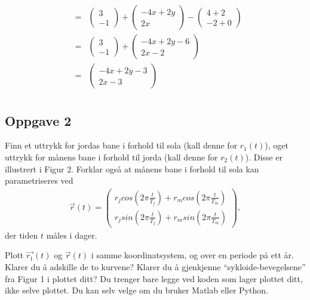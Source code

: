 \documentclass{../../myassignment}
\begin{document}
\begin{answer}
\begin{eqnarray*}
										&=& \begin{pmatrix} 3 \\ -1 \end{pmatrix} + \begin{pmatrix} -4x+2y \\ 2x \end{pmatrix} - \begin{pmatrix} 4+2 \\ -2+0 \end{pmatrix}\\
										&=& \begin{pmatrix} 3 \\ -1 \end{pmatrix} + \begin{pmatrix} -4x+2y-6\\ 2x-2 \end{pmatrix}\\
										&=& \begin{pmatrix} -4x+2y-3\\ 2x-3 \end{pmatrix}\\
			\end{eqnarray*}
		\end{answer}

	\subsection*{Oppgave 2}

	\begin{problem}
		Finn et uttrykk for jordas bane i forhold til sola (kall denne for $r_1(t)$), oget uttrykk for månens bane i forhold til jorda (kall denne for $r_2(t)$). Disse er illustrert i Figur 2. Forklar også at månens bane i forhold til sola kan parametriseres ved 
			\begin{eqnarray*}
				\vec{r}(t) = \begin{pmatrix}
					r_j cos(2\pi \frac{t}{T_j}) + r_m cos(2\pi \frac{t}{T_m}) \\
					r_j sin(2\pi \frac{t}{T_j}) +r_m sin(2\pi\frac{t}{T_m})
				\end{pmatrix},
			\end{eqnarray*}
				der tiden $t$ måles i dager.
	\end{problem}


	\begin{problem}
		Plott $\vec{r_1}(t)$ og $\vec{r}(t)$ i samme koordinatsystem, og over en periode på ett år. Klarer du å adskille de to kurvene? Klarer du å gjenkjenne “sykloide-bevegelsene” fra Figur 1 i plottet ditt? Du trenger bare legge ved koden som lager plottet ditt, ikke selve plottet. Du kan selv velge om du bruker Matlab eller Python.
	\end{problem}
\end{document}

